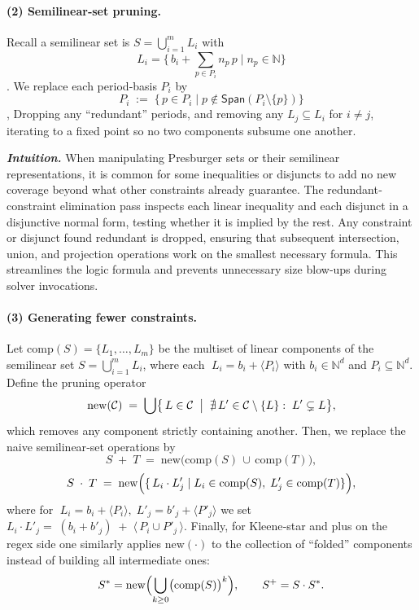 \paragraph{(2) Semilinear‐set pruning.}  
Recall a semilinear set is 
$
S=\bigcup_{i=1}^m L_i
$ 
with
\[
\displaystyle L_i=\{\,b_i+\sum_{p\in P_i}n_p\,p\mid n_p\in\mathbb N\}
\].  
%
We replace each period‐basis \(P_i\) by
\[
P_i \;:=\;\{\,p\in P_i \mid p\notin\mathsf{Span}(P_i\setminus\{p\})\}
\],
Dropping any ``redundant” periods, and removing any \(L_j\subseteq L_i\) for \(i\neq j\), iterating to a fixed point so no two components subsume one another.

\medskip
\noindent\textit{\textbf{Intuition.}}
When manipulating Presburger sets or their semilinear representations, it is common for some inequalities or disjuncts to add no new coverage beyond what other constraints already guarantee.  The redundant‐constraint elimination pass inspects each linear inequality and each disjunct in a disjunctive normal form, testing whether it is implied by the rest.  Any constraint or disjunct found redundant is dropped, ensuring that subsequent intersection, union, and projection operations work on the smallest necessary formula.  This streamlines the logic formula and prevents unnecessary size blow‐ups during solver invocations.


\paragraph{(3) Generating fewer constraints.}  
Let $\mathrm{comp}(S)=\{L_1,\dots,L_m\}$ 
be the multiset of linear components of the semilinear set 
\(\displaystyle S=\bigcup_{i=1}^m L_i\), where each 
\(\;L_i=b_i+\langle P_i\rangle\) with \(b_i\in\mathbb N^d\) and 
\(P_i\subseteq\mathbb N^d\).  Define the pruning operator
\[
\mathrm{new}(\mathcal C)
\;=\;
\bigcup\bigl\{\,L\in\mathcal C \;\bigm|\;\nexists\,L'\in\mathcal C\setminus\{L\}:\;L'\subsetneq L\bigr\},
\]
which removes any component strictly containing another.  
%
Then, we replace the naive semilinear‐set operations by
\[
S\;+\;T
\;=\;
\mathrm{new}\bigl(\mathrm{comp}(S)\,\cup\,\mathrm{comp}(T)\bigr),
\]
\[
S\;\cdot\;T
\;=\;
\mathrm{new}\Bigl(\{\,L_i\cdot L'_j \mid L_i\in\mathrm{comp}(S),\;L'_j\in\mathrm{comp}(T)\}\Bigr),
\]
where for
\(\;L_i=b_i+\langle P_i\rangle,\;L'_j=b'_j+\langle P'_j\rangle\) we set
$
L_i\cdot L'_j
=\;(b_i+b'_j)\;+\;\langle\,P_i\cup P'_j\,\rangle.
$
Finally, for Kleene‐star and plus on the regex side one similarly applies
\(\mathrm{new}(\cdot)\) to the collection of ``folded” components instead of
building all intermediate ones:
\[
S^*
=\mathrm{new}\Bigl(\bigcup_{k\ge0}\bigl(\mathrm{comp}(S)\bigr)^k\Bigr),
\qquad
S^+
=S\cdot S^*.
\]

